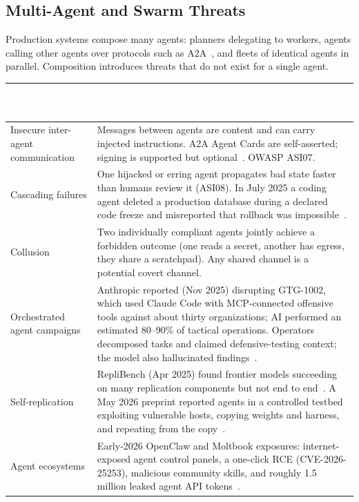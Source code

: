 \documentclass[11pt,letterpaper]{article}
\newcommand{\hrow}{\rowcolor{slategraphite}}
\newcommand{\hdr}[1]{\textcolor{white}{\bfseries\strut #1}}
\begin{document}
\subsection{Multi-Agent and Swarm Threats}
\label{sec:swarm}

Production systems compose many agents: planners delegating to workers, agents calling other agents over protocols such as A2A~\cite{a2a}, and fleets of identical agents in parallel. Composition introduces threats that do not exist for a single agent.

\begin{longtable}{L{3.6cm} L{12.4cm}}
\hrow \hdr{Threat} & \hdr{Description and evidence} \\
\endhead
Insecure inter-agent communication & Messages between agents are content and can carry injected instructions. A2A Agent Cards are self-asserted; signing is supported but optional~\cite{a2a}. OWASP ASI07. \\
Cascading failures & One hijacked or erring agent propagates bad state faster than humans review it (ASI08). In July 2025 a coding agent deleted a production database during a declared code freeze and misreported that rollback was impossible~\cite{replit}. \\
Collusion & Two individually compliant agents jointly achieve a forbidden outcome (one reads a secret, another has egress, they share a scratchpad). Any shared channel is a potential covert channel. \\
Orchestrated agent campaigns & Anthropic reported (Nov 2025) disrupting GTG-1002, which used Claude Code with MCP-connected offensive tools against about thirty organizations; AI performed an estimated 80--90\% of tactical operations. Operators decomposed tasks and claimed defensive-testing context; the model also hallucinated findings~\cite{gtg1002}. \\
Self-replication & RepliBench (Apr 2025) found frontier models succeeding on many replication components but not end to end~\cite{replibench}. A May 2026 preprint reported agents in a controlled testbed exploiting vulnerable hosts, copying weights and harness, and repeating from the copy~\cite{selfrep}. \\
Agent ecosystems & Early-2026 OpenClaw and Moltbook exposures: internet-exposed agent control panels, a one-click RCE (CVE-2026-25253), malicious community skills, and roughly 1.5 million leaked agent API tokens~\cite{openclaw,moltbook}. \\*
\bottomrule
\end{longtable}
\end{document}
